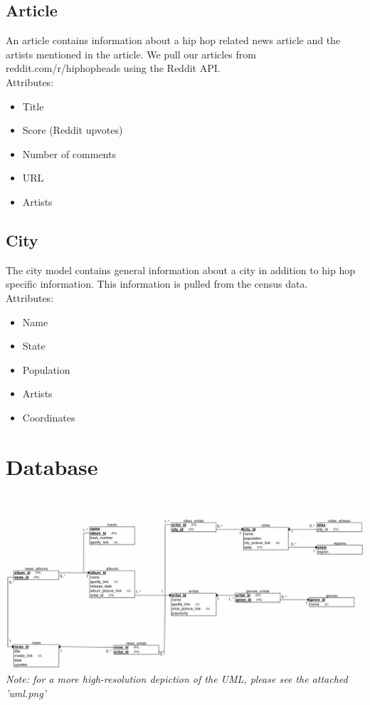 \documentclass{scrartcl}
\begin{document}
\subsection{Article}
An article contains information about a hip hop related news article and the artists mentioned in the article. We pull our articles from reddit.com/r/hiphopheads using the Reddit API.\\

Attributes:
\begin{itemize}
    \item Title
    \item Score (Reddit upvotes)
    \item Number of comments
    \item URL
    \item Artists
\end{itemize}

\subsection{City}
The city model contains general information about a city in addition to hip hop specific information. This information is pulled from the census data.\\

Attributes:
\begin{itemize}
    \item Name
    \item State
    \item Population
    \item Artists
    \item Coordinates
\end{itemize}

\section{Database}
\includegraphics[width=1\textwidth]{uml}
\textit{Note: for a more high-resolution depiction of the UML, please see the attached 'uml.png'}\\
\end{document}
